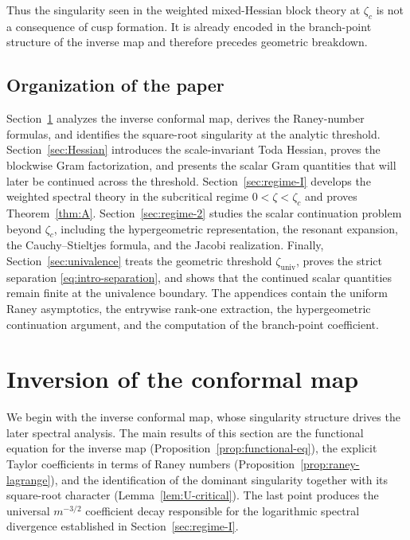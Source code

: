 \documentclass[11pt]{amsart}
\numberwithin{equation}{section}
\theoremstyle{plain}
\theoremstyle{definition}
\theoremstyle{remark}
\begin{document}
Thus the singularity seen in the weighted mixed-Hessian block theory at \(\zeta_c\) is not a consequence of
cusp formation. It is already encoded in the branch-point structure of the
inverse map and therefore precedes geometric breakdown.

\subsection{Organization of the paper}
\label{subsec:organization}

Section~\ref{sec:inversion} analyzes the inverse conformal map, derives the
Raney-number formulas, and identifies the square-root singularity at the
analytic threshold. Section~\ref{sec:Hessian} introduces the scale-invariant
Toda Hessian, proves the blockwise Gram factorization, and presents the scalar
Gram quantities that will later be continued across the threshold.
Section~\ref{sec:regime-I} develops the weighted spectral theory in the
subcritical regime \(0<\zeta<\zeta_c\) and proves Theorem~\ref{thm:A}.
Section~\ref{sec:regime-2} studies the scalar continuation problem beyond
\(\zeta_c\), including the hypergeometric representation, the resonant
expansion, the Cauchy--Stieltjes formula, and the Jacobi realization.
Finally, Section~\ref{sec:univalence} treats the geometric threshold
\(\zeta_{\mathrm{univ}}\), proves the strict separation
\eqref{eq:intro-separation}, and shows that the continued scalar quantities remain
finite at the univalence boundary. The appendices contain the uniform Raney
asymptotics, the entrywise rank-one extraction, the hypergeometric
continuation argument, and the computation of the branch-point coefficient.


\section{Inversion of the conformal map}
\label{sec:inversion}


We begin with the inverse conformal map, whose singularity structure drives
the later spectral analysis. The main results of this section are the functional equation for the inverse map
(Proposition~\ref{prop:functional-eq}), the explicit Taylor coefficients in terms of Raney numbers
(Proposition~\ref{prop:raney-lagrange}), and the identification of the dominant singularity together with its square-root character
(Lemma~\ref{lem:U-critical}). The last point produces the universal
$m^{-3/2}$ coefficient decay responsible for the logarithmic spectral
divergence established in Section~\ref{sec:regime-I}.
\end{document}
